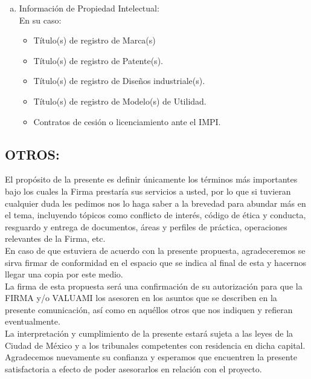 \documentclass[5pt,letter]{article}
\begin{document}
\begin{enumerate}[a)]
\item Información de Propiedad Intelectual:\\


En su caso:
\begin{itemize}
\item Título(s) de registro de Marca(s)
\item Título(s) de registro de Patente(s).
\item Título(s) de registro de Diseños industriale(s).
\item Título(s) de registro de Modelo(s) de Utilidad.
\item Contratos de cesión o licenciamiento ante el IMPI. 
\end{itemize}
\end{enumerate}

  \begin{center}
 \section{OTROS:}
 \end{center}
 
 El propósito de la presente es definir únicamente los términos más importantes bajo los cuales la Firma prestaría sus servicios a usted, por lo que si tuvieran cualquier duda les pedimos nos lo haga saber a la brevedad para abundar más en el tema, incluyendo tópicos como conflicto de interés, código de ética y conducta, resguardo y entrega de documentos, áreas y perfiles de práctica, operaciones relevantes de la Firma, etc.\\
 
En caso de que estuviera de acuerdo con la presente propuesta, agradeceremos se sirva firmar de conformidad en el espacio que se indica al final de esta y hacernos llegar una copia por este medio.\\
 
 La firma de esta propuesta será una confirmación de su autorización para que la FIRMA y/o VALUAMI los asesoren en los asuntos que se describen en la presente comunicación, así como en aquéllos otros que nos indiquen y refieran eventualmente.\\
 
 La interpretación y cumplimiento de la presente estará sujeta a las leyes de la Ciudad de México y a los tribunales competentes con residencia en dicha capital.\\
 
 Agradecemos nuevamente su confianza y esperamos que encuentren la presente satisfactoria a efecto de poder asesorarlos en relación con el proyecto.\\		
 
\end{document}
